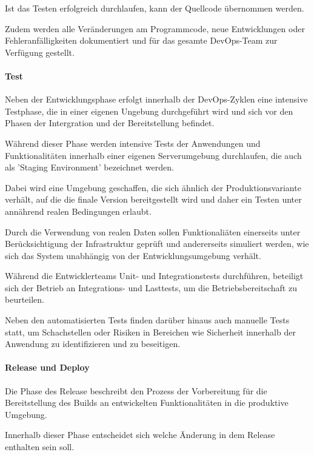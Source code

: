 Ist das Testen erfolgreich durchlaufen, kann der Quellcode übernommen werden. 

Zudem werden alle Veränderungen am Programmcode, neue Entwicklungen oder Fehleranfälligkeiten dokumentiert und für das gesamte DevOps-Team zur Verfügung gestellt.

\paragraph{Test}

Neben der Entwicklungsphase erfolgt innerhalb der DevOps-Zyklen eine intensive Testphase, die in einer eigenen Ungebung durchgeführt wird und sich vor den Phasen der Intergration und der Bereitstellung befindet. 

Während dieser Phase werden intensive Tests der Anwendungen und Funktionalitäten innerhalb einer eigenen Serverumgebung durchlaufen, die auch als 'Staging Environment' bezeichnet werden. \cite[S. 16]{verona_practical_2016} 

Dabei wird eine Umgebung geschaffen, die sich ähnlich der Produktionsvariante verhält, auf die die finale Version bereitgestellt wird und daher ein Testen unter annährend realen Bedingungen erlaubt. \cite[S. 5.2/5.6]{bass_devops_2015}

Durch die Verwendung von realen Daten sollen Funktionaliäten einerseits unter Berücksichtigung der Infrastruktur geprüft und andererseits simuliert werden, wie sich das System unabhängig von der Entwicklungsumgebung verhält. \cite[S. 16]{verona_practical_2016} 

Während die Entwicklerteams Unit- und Integrationstests durchführen, beteiligt sich der Betrieb an Integrations- und Lasttests, um die Betriebsbereitschaft zu beurteilen. \cite[S. 127]{sturm_devops_2017}  

Neben den automatisierten Tests finden darüber hinaus auch manuelle Tests statt, um Schachstellen oder Risiken in Bereichen wie Sicherheit innerhalb der Anwendung zu identifizieren und zu beseitigen.

\paragraph{Release und Deploy}

Die Phase des Release beschreibt den Prozess der Vorbereitung für die Bereitstellung des Builds an entwickelten Funktionalitäten in die produktive Umgebung. \cite[S. 20]{halstenberg_devops_2020} 

Innerhalb dieser Phase entscheidet sich welche Änderung in dem Release enthalten sein soll. 

